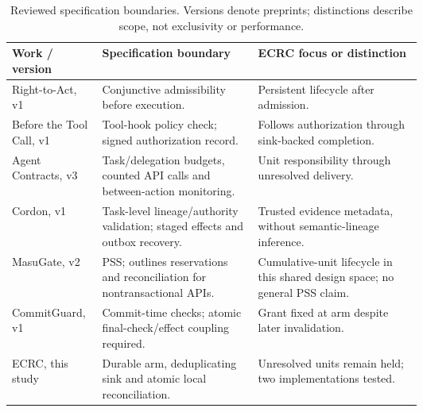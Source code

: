 \begin{table}[!htbp]
\centering
\caption{Reviewed specification boundaries. Versions denote preprints; distinctions describe scope, not exclusivity or performance.}
\label{tab:closest_scope}
\small
\setlength{\tabcolsep}{4pt}
\renewcommand{\arraystretch}{1.14}
\begin{tabular}{@{}>{\raggedright\arraybackslash}p{0.22\linewidth}>{\raggedright\arraybackslash}p{0.38\linewidth}>{\raggedright\arraybackslash}p{}@{}}
\hline
Work / version & Specification boundary & ECRC focus or distinction \\
\hline
Right-to-Act, v1~\cite{lavi2026right} & Conjunctive admissibility before execution. & Persistent lifecycle after admission. \\
Before the Tool Call, v1~\cite{uchibeke2026before} & Tool-hook policy check; signed authorization record. & Follows authorization through sink-backed completion. \\
Agent Contracts, v3~\cite{ye2026contracts} & Task/delegation budgets, counted API calls and between-action monitoring. & Unit responsibility through unresolved delivery. \\
Cordon, v1~\cite{chen2026cordon} & Task-level lineage/authority validation; staged effects and outbox recovery. & Trusted evidence metadata, without semantic-lineage inference. \\
MasuGate, v2~\cite{peng2026masugate} & PSS; outlines reservations and reconciliation for nontransactional APIs. & Cumulative-unit lifecycle in this shared design space; no general PSS claim. \\
CommitGuard, v1~\cite{santosgrueiro2026commit} & Commit-time checks; atomic final-check/effect coupling required. & Grant fixed at arm despite later invalidation. \\
ECRC, this study & Durable arm, deduplicating sink and atomic local reconciliation. & Unresolved units remain held; two implementations tested. \\
\hline
\end{tabular}
\end{table}
